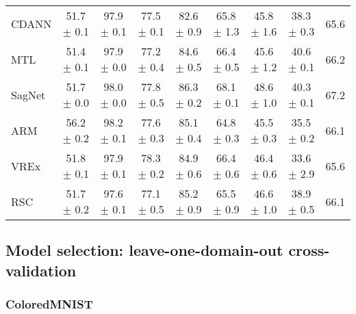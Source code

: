 \documentclass{article}
\begin{document}
\begin{center}
{\begin{tabular}{lcccccccc}
CDANN                     & 51.7 $\pm$ 0.1            & 97.9 $\pm$ 0.1            & 77.5 $\pm$ 0.1            & 82.6 $\pm$ 0.9            & 65.8 $\pm$ 1.3            & 45.8 $\pm$ 1.6            & 38.3 $\pm$ 0.3            & 65.6                      \\
MTL                       & 51.4 $\pm$ 0.1            & 97.9 $\pm$ 0.0            & 77.2 $\pm$ 0.4            & 84.6 $\pm$ 0.5            & 66.4 $\pm$ 0.5            & 45.6 $\pm$ 1.2            & 40.6 $\pm$ 0.1            & 66.2                      \\
SagNet                    & 51.7 $\pm$ 0.0            & 98.0 $\pm$ 0.0            & 77.8 $\pm$ 0.5            & 86.3 $\pm$ 0.2            & 68.1 $\pm$ 0.1            & 48.6 $\pm$ 1.0            & 40.3 $\pm$ 0.1            & 67.2                      \\
ARM                       & 56.2 $\pm$ 0.2            & 98.2 $\pm$ 0.1            & 77.6 $\pm$ 0.3            & 85.1 $\pm$ 0.4            & 64.8 $\pm$ 0.3            & 45.5 $\pm$ 0.3            & 35.5 $\pm$ 0.2            & 66.1                      \\
VREx                      & 51.8 $\pm$ 0.1            & 97.9 $\pm$ 0.1            & 78.3 $\pm$ 0.2            & 84.9 $\pm$ 0.6            & 66.4 $\pm$ 0.6            & 46.4 $\pm$ 0.6            & 33.6 $\pm$ 2.9            & 65.6                      \\
RSC                       & 51.7 $\pm$ 0.2            & 97.6 $\pm$ 0.1            & 77.1 $\pm$ 0.5            & 85.2 $\pm$ 0.9            & 65.5 $\pm$ 0.9            & 46.6 $\pm$ 1.0            & 38.9 $\pm$ 0.5            & 66.1                      \\
\bottomrule
\end{tabular}}
\end{center}

\subsection{Model selection: leave-one-domain-out cross-validation}

\subsubsection{ColoredMNIST}
\end{document}
